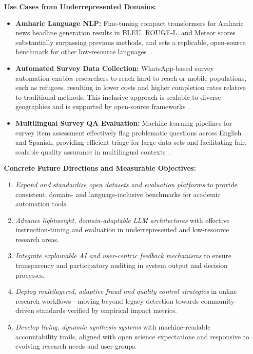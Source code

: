 \documentclass[sigconf]{acmart}
\begin{document}
\textbf{Use Cases from Underrepresented Domains:}
\begin{itemize}[leftmargin=*,nosep,label={}]
\item \textbf{Amharic Language NLP:} Fine-tuning compact transformers for Amharic news headline generation results in BLEU, ROUGE-L, and Meteor scores substantially surpassing previous methods, and sets a replicable, open-source benchmark for other low-resource languages~\cite{ref105}.
\item \textbf{Automated Survey Data Collection:} WhatsApp-based survey automation enables researchers to reach hard-to-reach or mobile populations, such as refugees, resulting in lower costs and higher completion rates relative to traditional methods. This inclusive approach is scalable to diverse geographies and is supported by open-source frameworks~\cite{ref117}.
\item \textbf{Multilingual Survey QA Evaluation:} Machine learning pipelines for survey item assessment effectively flag problematic questions across English and Spanish, providing efficient triage for large data sets and facilitating fair, scalable quality assurance in multilingual contexts~\cite{ref93}.
\end{itemize}

\textbf{Concrete Future Directions and Measurable Objectives:}
\begin{enumerate}[leftmargin=*,nosep,label={}]
\item \emph{Expand and standardize open datasets and evaluation platforms} to provide consistent, domain- and language-inclusive benchmarks for academic automation tools.
\item \emph{Advance lightweight, domain-adaptable LLM architectures} with effective instruction-tuning and evaluation in underrepresented and low-resource research areas.
\item \emph{Integrate explainable AI and user-centric feedback mechanisms} to ensure transparency and participatory auditing in system output and decision processes.
\item \emph{Deploy multilayered, adaptive fraud and quality control strategies} in online research workflows—moving beyond legacy detection towards community-driven standards verified by empirical impact metrics.
\item \emph{Develop living, dynamic synthesis systems} with machine-readable accountability trails, aligned with open science expectations and responsive to evolving research needs and user groups.
\end{enumerate}
\end{document}
